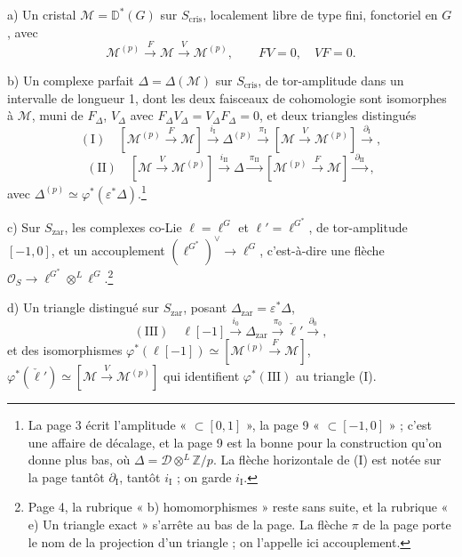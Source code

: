 \documentclass[11pt,a4paper]{article}
\begin{document}
a) Un cristal $\mathcal{M} = \mathbb{D}^{*}(G)$ sur $S_{\mathrm{cris}}$,
localement libre de type fini, fonctoriel en $G$, avec
\[
\mathcal{M}^{(p)} \xrightarrow{\ F\ } \mathcal{M} \xrightarrow{\ V\ }
\mathcal{M}^{(p)}, \qquad FV = 0, \quad VF = 0.
\]

b) Un complexe parfait $\Delta = \Delta(\mathcal{M})$ sur $S_{\mathrm{cris}}$,
de tor-amplitude dans un intervalle de longueur 1, dont les deux faisceaux
de cohomologie sont isomorphes à $\mathcal{M}$, muni de $F_{\Delta}$,
$V_{\Delta}$ avec $F_{\Delta}V_{\Delta} = V_{\Delta}F_{\Delta} = 0$, et deux
triangles distingués
\[
(\mathrm{I}) \quad [\mathcal{M}^{(p)} \xrightarrow{F} \mathcal{M}]
\xrightarrow{\ i_{\mathrm{I}}\ } \Delta^{(p)}
\xrightarrow{\ \pi_{\mathrm{I}}\ } [\mathcal{M} \xrightarrow{V} \mathcal{M}^{(p)}]
\xrightarrow{\ \partial_{\mathrm{I}}\ } ,
\]
\[
(\mathrm{II}) \quad [\mathcal{M} \xrightarrow{V} \mathcal{M}^{(p)}]
\xrightarrow{\ i_{\mathrm{II}}\ } \Delta
\xrightarrow{\ \pi_{\mathrm{II}}\ } [\mathcal{M}^{(p)} \xrightarrow{F} \mathcal{M}]
\xrightarrow{\ \partial_{\mathrm{II}}\ } ,
\]
avec $\Delta^{(p)} \simeq \varphi^{*}(\varepsilon^{*}\Delta)$.\footnote{La
page 3 écrit l'amplitude « $\subset [0,1]$ », la page 9 « $\subset [-1,0]$ » ;
c'est une affaire de décalage, et la page 9 est la bonne pour la construction
qu'on donne plus bas, où $\Delta = \mathcal{D} \otimes^{L} \mathbb{Z}/p$. La
flèche horizontale de (I) est notée sur la page tantôt $\partial_{\mathrm{I}}$,
tantôt $i_{\mathrm{I}}$ ; on garde $i_{\mathrm{I}}$.}

c) Sur $S_{\mathrm{zar}}$, les complexes co-Lie $\ell = \ell^{G}$ et
$\ell' = \ell^{G^{*}}$, de tor-amplitude $[-1,0]$, et un accouplement
$(\ell^{G^{*}})^{\vee} \to \ell^{G}$, c'est-à-dire une flèche
$\mathcal{O}_{S} \to \ell^{G^{*}} \otimes^{L} \ell^{G}$.\footnote{Page 4, la
rubrique « b) homomorphismes » reste sans suite, et la rubrique « e) Un
triangle exact » s'arrête au bas de la page. La flèche $\pi$ de la page porte
le nom de la projection d'un triangle ; on l'appelle ici accouplement.}

d) Un triangle distingué sur $S_{\mathrm{zar}}$, posant
$\Delta_{\mathrm{zar}} = \varepsilon^{*}\Delta$,
\[
(\mathrm{III}) \quad \ell[-1] \xrightarrow{\ i_{0}\ } \Delta_{\mathrm{zar}}
\xrightarrow{\ \pi_{0}\ } \check\ell' \xrightarrow{\ \partial_{0}\ } ,
\]
et des isomorphismes $\varphi^{*}(\ell[-1]) \simeq [\mathcal{M}^{(p)}
\xrightarrow{F} \mathcal{M}]$, $\varphi^{*}(\check\ell') \simeq
[\mathcal{M} \xrightarrow{V} \mathcal{M}^{(p)}]$ qui identifient
$\varphi^{*}(\mathrm{III})$ au triangle (I).
\end{document}
